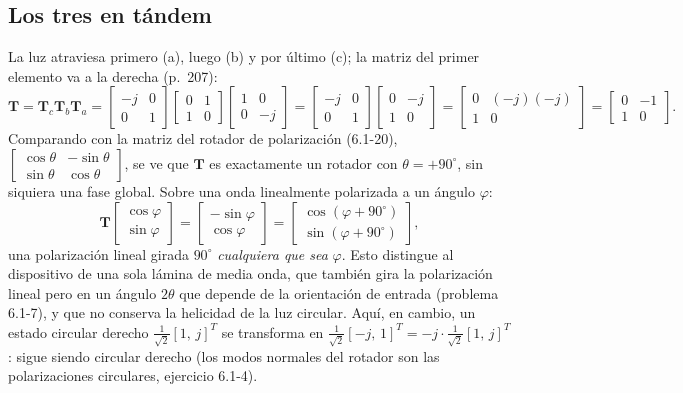 \documentclass{article}
\newcommand{\Tm}{\mathbf{T}}
\begin{document}
\subsection*{Los tres en tándem}

La luz atraviesa primero (a), luego (b) y por último (c); la matriz del primer elemento va a la
derecha (p.~207):
\[
\Tm=\Tm_c\Tm_b\Tm_a
=\begin{bmatrix}-j&0\\0&1\end{bmatrix}
\begin{bmatrix}0&1\\1&0\end{bmatrix}
\begin{bmatrix}1&0\\0&-j\end{bmatrix}
=\begin{bmatrix}-j&0\\0&1\end{bmatrix}
\begin{bmatrix}0&-j\\1&0\end{bmatrix}
=\begin{bmatrix}0&(-j)(-j)\\1&0\end{bmatrix}
=\boxed{\begin{bmatrix}0&-1\\1&0\end{bmatrix}}.
\]
Comparando con la matriz del rotador de polarización (6.1-20),
$\begin{bmatrix}\cos\theta&-\sin\theta\\ \sin\theta&\cos\theta\end{bmatrix}$, se ve que
$\Tm$ es exactamente un rotador con $\theta=+90^\circ$, sin siquiera una fase global.
Sobre una onda linealmente polarizada a un ángulo $\varphi$:
\[
\Tm\begin{bmatrix}\cos\varphi\\ \sin\varphi\end{bmatrix}
=\begin{bmatrix}-\sin\varphi\\ \cos\varphi\end{bmatrix}
=\begin{bmatrix}\cos(\varphi+90^\circ)\\ \sin(\varphi+90^\circ)\end{bmatrix},
\]
una polarización lineal girada $90^\circ$ \emph{cualquiera que sea} $\varphi$. Esto distingue al
dispositivo de una sola lámina de media onda, que también gira la polarización lineal pero en un
ángulo $2\theta$ que depende de la orientación de entrada (problema 6.1-7), y que no conserva la
helicidad de la luz circular. Aquí, en cambio, un estado circular derecho
$\tfrac{1}{\sqrt2}[1,\,j]^T$ se transforma en $\tfrac{1}{\sqrt2}[-j,\,1]^T=-j\cdot\tfrac{1}{\sqrt2}[1,\,j]^T$:
sigue siendo circular derecho (los modos normales del rotador son las polarizaciones circulares,
ejercicio 6.1-4).
\end{document}
